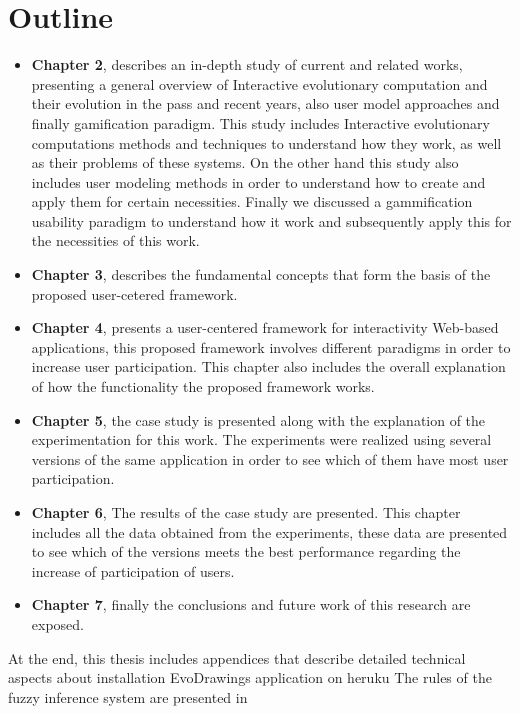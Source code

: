 \section{Outline}

\begin{itemize}
\item \textbf{Chapter 2}, describes an in-depth study of current and related
works, presenting a general overview of Interactive evolutionary computation and
their evolution in the pass and recent years, also user model approaches and
finally gamification paradigm. This study includes Interactive evolutionary
computations methods and techniques to understand how they work, as well as
their problems of these systems. On the other hand this study also includes user
modeling methods in order to understand how to create and apply them for certain
necessities. Finally we discussed a gammification usability paradigm to
understand how it work and subsequently apply this for the necessities of this
work.

\item \textbf{Chapter 3}, describes the fundamental
concepts that form the basis of the proposed user-cetered framework.

\item \textbf{Chapter 4}, presents a user-centered framework for interactivity
Web-based applications, this proposed framework involves different paradigms in
order to increase user participation. This chapter also includes the overall
explanation of how the functionality the proposed framework works.

\item \textbf{Chapter 5}, the case study is presented along with the
explanation of the experimentation for this work. The experiments were realized
using several versions of the same application in order to see which of them
have most user participation.

\item \textbf{Chapter 6}, The results of the case study are presented. This
chapter includes all the data obtained from the experiments, these data are
presented to see which of the versions meets the best performance regarding the
increase of participation of users.

\item \textbf{Chapter 7}, finally the conclusions and future work of this
research are exposed.
\end{itemize}

At the end, this thesis includes appendices that describe
detailed technical aspects about installation EvoDrawings application on heruku
The rules of the fuzzy inference system are presented in  %

